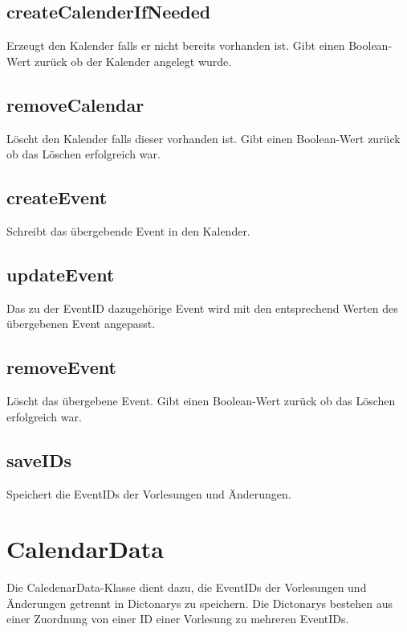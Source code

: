 \subsection{createCalenderIfNeeded}
Erzeugt den Kalender falls er nicht bereits vorhanden ist. Gibt einen Boolean-Wert zurück ob der Kalender angelegt wurde.

\subsection{removeCalendar}
Löscht den Kalender falls dieser vorhanden ist. Gibt einen Boolean-Wert zurück ob das Löschen erfolgreich war.

\subsection{createEvent}
Schreibt das übergebende Event in den Kalender.

\subsection{updateEvent}
Das zu der EventID dazugehörige Event wird mit den entsprechend Werten des übergebenen Event angepasst.

\subsection{removeEvent}
Löscht das übergebene Event. Gibt einen Boolean-Wert zurück ob das Löschen erfolgreich war.

\subsection{saveIDs}
Speichert die EventIDs der Vorlesungen und Änderungen.

\section{CalendarData}
Die CaledenarData-Klasse dient dazu, die EventIDs der Vorlesungen und Änderungen getrennt in Dictonarys zu speichern.
Die Dictonarys bestehen aus einer Zuordnung von einer ID einer Vorlesung zu mehreren EventIDs.

